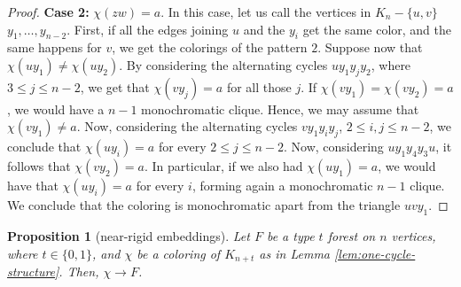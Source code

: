 \documentclass[11pt]{article}
\newtheorem{proposition}[theorem]{Proposition}
\begin{document}
\begin{proof}
    \medskip
    
    \textbf{Case 2:} $\chi(zw)= a$. In this case, let us call the vertices in $K_n-\{u,v\}$ $y_1,\dots,y_{n-2}$. First, if all the edges joining $u$ and the $y_i$ get the same color, and the same happens for $v$, we get the colorings of the pattern $2$. Suppose now that $\chi(uy_1) \neq \chi(uy_2)$. By considering the alternating cycles $uy_1y_jy_2$, where $3 \leq j \leq n-2$, we get that $\chi(vy_j)=a$ for all those $j$. If $\chi(vy_1)=\chi(vy_2)=a$, we would have a $n-1$ monochromatic clique. Hence, we may assume that $\chi(vy_1) \neq a$. Now, considering the alternating cycles $vy_1y_iy_j$, $2 \leq i, j \leq n-2$, we conclude that $\chi(uy_i)=a$ for every $2 \leq j \leq n-2$. Now, considering $uy_1y_4y_3u$, it follows that $\chi(vy_2)=a$. In particular, if we also had $\chi(uy_1) = a$, we would have that $\chi(uy_i)=a$ for every $i$, forming again a monochromatic $n-1$ clique. We conclude that the coloring is monochromatic apart from the triangle $uvy_1$.
    
\end{proof}

\begin{proposition}[near-rigid embeddings]\label{prop:near-rigid}
    Let $F$ be a type $t$ forest on $n$ vertices, where $t \in \{0,1\}$, and $\chi$ be a coloring of $K_{n+t}$ as in Lemma \ref{lem:one-cycle-structure}. Then, $\chi \rightarrow F$.
\end{proposition}
\end{document}
